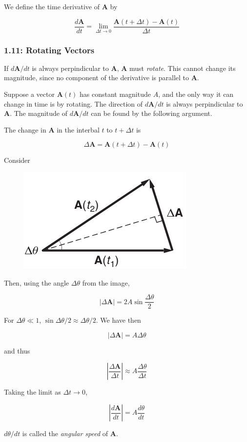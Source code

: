 \documentclass[12pt,twoside]{article}
\begin{document}
\begin{flushleft}
We define the time derivative of $\mathbf{A}$ by

$$
\frac{d\mathbf{A}}{dt} = \lim_{\Delta t \rightarrow 0}\frac{\mathbf{A}(t+\Delta t) - \mathbf{A}(t)}{\Delta t}
$$

\subsubsection*{1.11: Rotating Vectors}

If $d\mathbf{A}/dt$ is always perpindicular to $\mathbf{A}$, $\mathbf{A}$ must \textit{rotate}. This
cannot change its magnitude, since no component of the derivative is parallel to $\mathbf{A}$.

Suppose a vector $\mathbf{A}(t)$ has constant magnitude $A$, and the only way it can change in time
is by rotating. The direction of $d\mathbf{A}/dt$ is always perpindicular to $\mathbf{A}$. The magnitude
of $d\mathbf{A}/dt$ can be found by the following argument.

The change in $\mathbf{A}$ in the interbal $t$ to $t + \Delta t$ is

$$
\Delta \mathbf{A} = \mathbf{A}(t + \Delta t) - \mathbf{A}(t)
$$

Consider
\begin{figure}[H]
\includegraphics[scale=.4]{images/chapter1/image5.png}
\centering
\end{figure}

Then, using the angle $\Delta \theta$ from the image,

$$
|\Delta\mathbf{A}| = 2A\sin{\frac{\Delta \theta}{2}}
$$

For $\Delta\theta \ll 1$, $\sin{\Delta\theta/2} \approx \Delta\theta/2$. We have then

$$
|\Delta\mathbf{A}| = A\Delta\theta
$$

and thus

$$
\left|\frac{\Delta\mathbf{A}}{\Delta t}\right| \approx A\frac{\Delta\theta}{\Delta t}
$$

Taking the limit as $\Delta t \rightarrow 0$,

$$
\left|\frac{d\mathbf{A}}{dt}\right| = A\frac{d\theta}{dt}
$$

$d\theta/dt$ is called the \textit{angular speed} of $\mathbf{A}$.


\end{flushleft}
\end{document}
